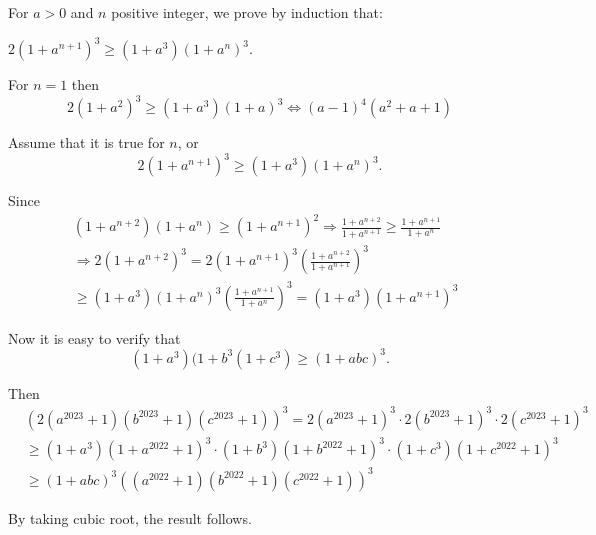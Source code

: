 \documentclass{article}
\begin{document}
\begin{soln}
    For $a > 0$ and $n$ positive integer, we prove by induction that:
    \begin{claim*}
        $2(1 + a^{n+1})^3 \ge (1+a^3) (1+a^n)^3.$
    \end{claim*}
    \begin{subproof}
        For $n=1$ then 
        \[
            2(1+a^2)^3 \ge (1+a^3) (1+a)^3 \Leftrightarrow (a-1)^4 (a^2+a+1)
        \]
    
        Assume that it is true for $n$, or
        \[
            2(1+a^{n+1})^3 \ge (1+a^3) (1+a^{n})^3.
        \]
    
        Since
        \[
            \begin{aligned}
                &(1 + a^{n+2})(1+a^n) \ge (1+a^{n+1})^2 \Rightarrow \frac{1+a^{n+2} }{1+a^{n+1}} \ge \frac{1+a^{n+1}}{1+a^n}\\
                &\Rightarrow 2(1+a^{n+2})^3 = 2 (1+a^{n+1})^3 \left( \frac{ 1+a^{n+2}}{1+a^{n+1}}\right)^3\\
                &\ge (1+a^3) (1+a^{n})^3 \left( \frac{ 1+a^{n+1}}{1+a^{n}}\right)^3
                = (1+a^3) (1+a^{n+1})^3
            \end{aligned}
        \]
    \end{subproof}

    Now it is easy to verify that
    \[
        (1+a^3)(1+b^3(1+c^3) \ge (1+abc)^3.
    \]

    Then 
    \[
        \begin{aligned}
            &(2(a^{2023} + 1)(b^{2023} + 1)(c^{2023} + 1))^3 = 2 (a^{2023} + 1)^3 \cdot 2 (b^{2023} + 1)^3 \cdot 2 (c^{2023} + 1)^3 \\
            &\ge (1+a^3)(1+a^{2022} + 1)^3 \cdot (1+b^3)(1+b^{2022} + 1)^3 \cdot (1+c^3)(1+c^{2022} + 1)^3\\
            &\ge (1+abc)^3 ((a^{2022} + 1)(b^{2022} + 1)(c^{2022} + 1))^3
        \end{aligned}
    \]

    By taking cubic root, the result follows.
\end{soln}
\end{document}
